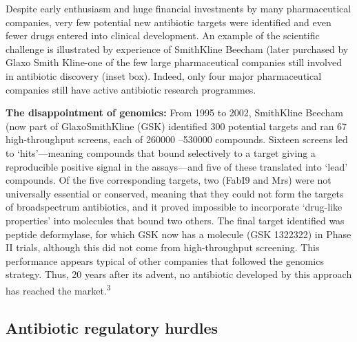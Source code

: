 \documentclass[
]{book}
\begin{document}
Despite early enthusiasm and huge financial investments by many pharmaceutical companies, very few potential new antibiotic targets were identified and even fewer drugs entered into clinical development. An example of the scientific challenge is illustrated by experience of SmithKline Beecham (later purchased by Glaxo Smith Kline-one of the few large pharmaceutical companies still involved in antibiotic discovery (inset box). Indeed, only four major pharmaceutical companies still have active antibiotic research programmes.

\textbf{The disappointment of genomics:} From 1995 to 2002, SmithKline Beecham (now part of GlaxoSmithKline (GSK) identified 300 potential targets and ran 67 high-throughput screens, each of 260000 --530000 compounds. Sixteen screens led to `hits'---meaning compounds that bound selectively to a target giving a reproducible positive signal in the assays---and five of these translated into `lead' compounds. Of the five corresponding targets, two (FabI9 and Mrs) were not universally essential or conserved, meaning that they could not form the targets of broadspectrum antibiotics, and it proved impossible to incorporate `drug-like properties' into molecules that bound two others. The final target identified was peptide deformylase, for which GSK now has a molecule (GSK 1322322) in Phase II trials, although this did not come from high-throughput screening. This performance appears typical of other companies that followed the genomics strategy. Thus, 20 years after its advent, no antibiotic developed by this approach has reached the market.\textsuperscript{3}

\hypertarget{antibiotic-regulatory-hurdles}{%
\subsection*{Antibiotic regulatory hurdles}\label{antibiotic-regulatory-hurdles}}
\end{document}
